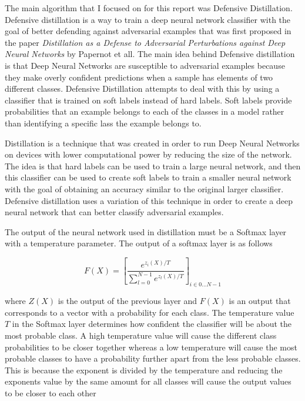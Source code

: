 \documentclass[../article.tex]{subfiles}
\begin{document}
The main algorithm that I focused on for this report was Defensive Distillation.
Defensive distillation is a way to train a deep neural network classifier with the goal of better defending against
adversarial examples that was first proposed in the paper \emph{Distillation as a Defense to Adversarial Perturbations against Deep Neural Networks} by Papernot et all.
The main idea behind Defensive distillation is that Deep Neural Networks are susceptible to adversarial examples because they make overly confident predictions when a sample has elements of two different classes.
Defensive Distillation attempts to deal with this by using a classifier that is trained on soft labels instead of hard labels. Soft labels provide probabilities that an example belongs to each of the classes in a model rather than identifying a specific lass the example belongs to.

Distillation is a technique that was created in order to run Deep Neural Networks on devices with lower computational power by reducing the size of the network. The idea is that hard labels can be used to train a large neural network, and then this classifier can be used to create soft labels to train a smaller neural network with the goal of obtaining an accuracy similar to the original larger classifier. Defensive distillation uses a variation of this technique in order to create a deep neural network that can better classify adversarial examples.

 The output of the neural network used in distillation must be a Softmax layer with a temperature parameter. The output of a softmax layer is as follows

\[ F(X) = \left[\frac{e^{z_i(X) / T}}{\sum_{l=0}^{N-1}e^{z_l(X) / T}}\right]_{i \in 0 \dots N - 1} \]

where $Z(X)$ is the output of the previous layer and $F(X)$ is an output that corresponds to a vector with a probability for each class. The temperature value $T$ in the Softmax layer determines how confident the classifier will be about the most probable class. A high temperature value will cause the different class probabilities to be closer together whereas a low temperature will cause the most probable classes to have  a probability further apart from the less probable classes. This is because the exponent is divided by the temperature and reducing the exponents value by the same amount for all classes will cause the output values to be closer to each other
\end{document}
